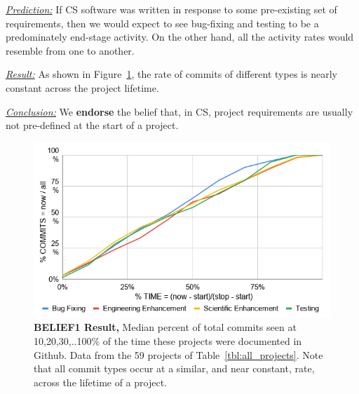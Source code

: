 \documentclass[sigconf,review,anonymous]{acmart}
\newcommand{\bi}{\begin{itemize}}
\newcommand{\ei}{\end{itemize}}
\newcommand{\fig}[1]{Figure~\ref{fig:#1}}
\newenvironment{RQ}{\vspace{1mm}\begin{tcolorbox}[enhanced,width=3.4in,size=fbox,colback=red!5!white,drop shadow southwest,sharp corners]}{\end{tcolorbox}}
\begin{document}
\noindent \textit{\underline{Prediction:}} If CS software was written in response to some pre-existing set of requirements, then
we would expect to see bug-fixing and testing to be a predominately end-stage activity. On the other hand, all the activity rates would resemble from one to another. 





 
\noindent \textit{\underline{Result:}} 
As shown in \fig{belief1}, the rate
of commits of different types
is nearly constant across the project
lifetime. 

\begin{RQ}
\textit{\underline{Conclusion:}}
We \textbf{endorse} the belief that, in CS, project requirements are usually not pre-defined
at the start of a project.
\end{RQ} 
 

\begin{figure}
\includegraphics[width=\linewidth]{img/belief1_1.png}
\caption{{\bf BELIEF1 Result,} 
Median percent  of total commits seen
at 10,20,30,..100\% of 
the time these projects were
documented in Github. Data from the 59
projects of Table~\ref{tbl:all_projects}.
Note
that all commit types occur
at a similar, and near constant,
rate, across the lifetime of a project.}\label{fig:belief1}

\end{figure}
\end{document}
